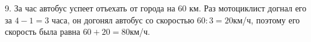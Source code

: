 9. За час автобус успеет отъехать от города на 60 км. Раз мотоциклист догнал его за $4-1=3$ часа, он догонял автобус со скоростью $60:3=20$км/ч, поэтому его скорость была равна $60+20=80$км/ч.\\
